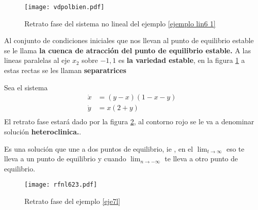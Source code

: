 \begin{ejemplo}
  \begin{figure}[htpb]
    \centering
    \texttt{[image: vdpolbien.pdf]}
    \caption{Retrato fase del sistema no lineal del ejemplo \ref{ejemplo lin6 1}  }
    \label{lin1}
  \end{figure}

  Al conjunto de condiciones iniciales que nos llevan al punto de equilibrio estable se le llama \textbf{la cuenca de atracción del punto de equilibrio estable.} A las lineas paralelas al eje $x_2$ sobre $-1,1$ es  \textbf{la variedad estable}, en la figura \ref{lin1} a estas rectas se les llaman \textbf{separatrices}
  \end{ejemplo}

  \begin{ejemplo} \label{eje7l}  Sea el sistema $$
  \begin{aligned}
    \dot{x} &= (y-x)(1-x-y) \\ 
    \dot{y} &= x(2+y) \\ 
  \end{aligned}
  $$
  El retrato fase estará dado por la figura \ref{lin2}, al contorno rojo se le va a denominar solución \textbf{heteroclinica.}.

  \begin{tcolorbox}[colback=Black!4,colframe=White]
  \begin{definicion}
    Es una solución que une a dos puntos de equilibrio, ie , en el $\lim_{t \to \infty} $ eso te lleva a un punto de equilibrio y cuando $\lim_{n \to -\infty} $ te lleva a otro punto de equilibrio.

  \end{definicion}
  \end{tcolorbox}

  \begin{figure}[htpb]
    \centering
    \texttt{[image: rfnl623.pdf]}
    \caption{Retrato fase del ejemplo \ref{eje7l}}
    \label{lin2}
  \end{figure}
    
  \end{ejemplo}

